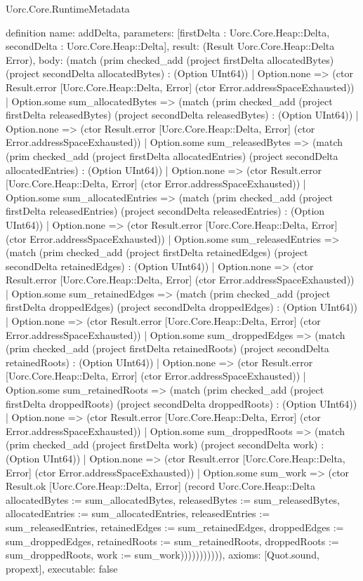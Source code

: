 \begin{lexlean}{Uorc.Core.RuntimeMetadata}
\begin{semanticmodule}
definition{
  name: addDelta,
  parameters: [firstDelta : Uorc.Core.Heap::Delta, secondDelta : Uorc.Core.Heap::Delta],
  result: (Result Uorc.Core.Heap::Delta Error),
  body: (match (prim checked_add (project firstDelta allocatedBytes) (project secondDelta allocatedBytes) : (Option UInt64))
    | Option.none => (ctor Result.error [Uorc.Core.Heap::Delta, Error] (ctor Error.addressSpaceExhausted))
    | Option.some sum_allocatedBytes => (match (prim checked_add (project firstDelta releasedBytes) (project secondDelta releasedBytes) : (Option UInt64))
      | Option.none => (ctor Result.error [Uorc.Core.Heap::Delta, Error] (ctor Error.addressSpaceExhausted))
      | Option.some sum_releasedBytes => (match (prim checked_add (project firstDelta allocatedEntries) (project secondDelta allocatedEntries) : (Option UInt64))
        | Option.none => (ctor Result.error [Uorc.Core.Heap::Delta, Error] (ctor Error.addressSpaceExhausted))
        | Option.some sum_allocatedEntries => (match (prim checked_add (project firstDelta releasedEntries) (project secondDelta releasedEntries) : (Option UInt64))
          | Option.none => (ctor Result.error [Uorc.Core.Heap::Delta, Error] (ctor Error.addressSpaceExhausted))
          | Option.some sum_releasedEntries => (match (prim checked_add (project firstDelta retainedEdges) (project secondDelta retainedEdges) : (Option UInt64))
            | Option.none => (ctor Result.error [Uorc.Core.Heap::Delta, Error] (ctor Error.addressSpaceExhausted))
            | Option.some sum_retainedEdges => (match (prim checked_add (project firstDelta droppedEdges) (project secondDelta droppedEdges) : (Option UInt64))
              | Option.none => (ctor Result.error [Uorc.Core.Heap::Delta, Error] (ctor Error.addressSpaceExhausted))
              | Option.some sum_droppedEdges => (match (prim checked_add (project firstDelta retainedRoots) (project secondDelta retainedRoots) : (Option UInt64))
                | Option.none => (ctor Result.error [Uorc.Core.Heap::Delta, Error] (ctor Error.addressSpaceExhausted))
                | Option.some sum_retainedRoots => (match (prim checked_add (project firstDelta droppedRoots) (project secondDelta droppedRoots) : (Option UInt64))
                  | Option.none => (ctor Result.error [Uorc.Core.Heap::Delta, Error] (ctor Error.addressSpaceExhausted))
                  | Option.some sum_droppedRoots => (match (prim checked_add (project firstDelta work) (project secondDelta work) : (Option UInt64))
                    | Option.none => (ctor Result.error [Uorc.Core.Heap::Delta, Error] (ctor Error.addressSpaceExhausted))
                    | Option.some sum_work => (ctor Result.ok [Uorc.Core.Heap::Delta, Error] (record Uorc.Core.Heap::Delta {allocatedBytes := sum_allocatedBytes, releasedBytes := sum_releasedBytes, allocatedEntries := sum_allocatedEntries, releasedEntries := sum_releasedEntries, retainedEdges := sum_retainedEdges, droppedEdges := sum_droppedEdges, retainedRoots := sum_retainedRoots, droppedRoots := sum_droppedRoots, work := sum_work}))))))))))),
  axioms: [Quot.sound, propext],
  executable: false
}


\end{semanticmodule}
\end{lexlean}
